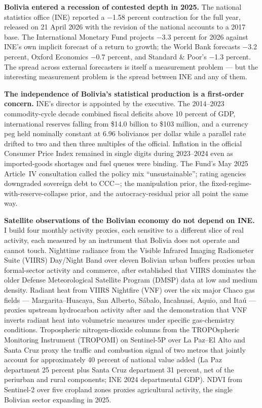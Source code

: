 \documentclass[11pt,letterpaper]{article}
\newcommand{\claim}[1]{\textbf{#1.}}
\begin{document}
\claim{Bolivia entered a recession of contested depth in 2025} The national statistics office (INE) reported a \num{-1.58} percent contraction for the full year, released on \num{21} April 2026 with the revision of the national accounts to a 2017 base. The International Monetary Fund projects \num{-3.3} percent for 2026 against INE's own implicit forecast of a return to growth; the World Bank forecasts \num{-3.2} percent, Oxford Economics \num{-0.7} percent, and Standard \& Poor's \num{-1.3} percent. The spread across external forecasters is itself a measurement problem --- but the interesting measurement problem is the spread between INE and any of them.

\claim{The independence of Bolivia's statistical production is a first-order concern} INE's director is appointed by the executive. The \numrange{2014}{2023} commodity-cycle decade combined fiscal deficits above \num{10} percent of GDP, international reserves falling from \$\num{14.0} billion to \$\num{103} million, and a currency peg held nominally constant at \num{6.96} bolivianos per dollar while a parallel rate drifted to two and then three multiples of the official. Inflation in the official Consumer Price Index remained in single digits during 2023--2024 even as imported-goods shortages and fuel queues were binding. The Fund's May 2025 Article~IV consultation called the policy mix ``unsustainable''; rating agencies downgraded sovereign debt to CCC$-$; the \citet{fernald_hsu_spiegel2021} manipulation prior, the \citet{michalski_stoltz2013} fixed-regime-with-reserve-collapse prior, and the \citet{martinez2022} autocracy-residual prior all point the same way.

\claim{Satellite observations of the Bolivian economy do not depend on INE} I build four monthly activity proxies, each sensitive to a different slice of real activity, each measured by an instrument that Bolivia does not operate and cannot touch. Nighttime radiance from the Visible Infrared Imaging Radiometer Suite (VIIRS) Day/Night Band over eleven Bolivian urban buffers proxies urban formal-sector activity and commerce, after \citet{gibson_etal2021} established that VIIRS dominates the older Defense Meteorological Satellite Program (DMSP) data at low and medium density. Radiant heat from VIIRS Nightfire (VNF) over the six major Chaco gas fields --- Margarita--Huacaya, San Alberto, Sábalo, Incahuasi, Aquio, and Itaú --- proxies upstream hydrocarbon activity after \citet{elvidge_vnf2013} and the \citet{do_etal2018} demonstration that VNF inverts radiant heat into volumetric measures under specific gas-chemistry conditions. Tropospheric nitrogen-dioxide columns from the TROPOspheric Monitoring Instrument (TROPOMI) on Sentinel-5P over La Paz--El Alto and Santa Cruz proxy the traffic and combustion signal of two metros that jointly account for approximately \num{40} percent of national value added (La Paz department \num{25} percent plus Santa Cruz department \num{31} percent, net of the periurban and rural components; INE 2024 departmental GDP). NDVI from Sentinel-2 over five cropland zones proxies agricultural activity, the single Bolivian sector expanding in \num{2025}.
\end{document}
